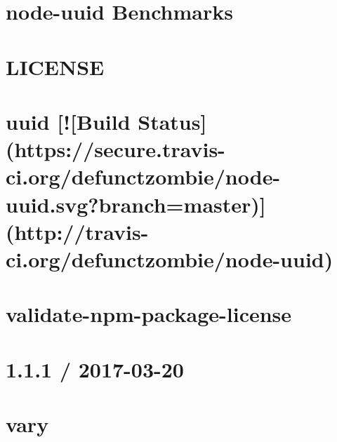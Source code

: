 \documentclass[twoside]{book}
\newcommand{\+}{\discretionary{\mbox{\scriptsize$\hookleftarrow$}}{}{}}
\begin{document}
\chapter{node-\/uuid Benchmarks}
\label{md__c_1_workspace_demo_src_main_script_node_modules_uuid_benchmark__r_e_a_d_m_e}

\chapter{L\+I\+C\+E\+N\+SE}
\label{md__c_1_workspace_demo_src_main_script_node_modules_uuid__l_i_c_e_n_s_e}

\chapter{uuid \mbox{[}!\mbox{[}Build Status\mbox{]}(https\+://secure.travis-\/ci.org/defunctzombie/node-\/uuid.svg?branch=master)\mbox{]}(http\+://travis-\/ci.org/defunctzombie/node-\/uuid)}
\label{md__c_1_workspace_demo_src_main_script_node_modules_uuid__r_e_a_d_m_e}

\chapter{validate-\/npm-\/package-\/license}
\label{md__c_1_workspace_demo_src_main_script_node_modules_validate-npm-package-license__r_e_a_d_m_e}

\chapter{1.1.1 / 2017-\/03-\/20}
\label{md__c_1_workspace_demo_src_main_script_node_modules_vary__h_i_s_t_o_r_y}

\chapter{vary}
\label{md__c_1_workspace_demo_src_main_script_node_modules_vary__r_e_a_d_m_e}

\end{document}
